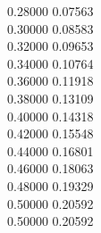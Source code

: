 \documentclass[a4paper,12pt,twoside]{report}
\numberwithin{equation}{chapter}
\begin{document}
\begin{texttt}
   0.28000\hspace{1cm}    0.07563 \\
   0.30000\hspace{1cm}    0.08583 \\
   0.32000\hspace{1cm}    0.09653 \\
   0.34000\hspace{1cm}    0.10764 \\
   0.36000\hspace{1cm}    0.11918 \\
   0.38000\hspace{1cm}    0.13109 \\
   0.40000\hspace{1cm}    0.14318 \\
   0.42000\hspace{1cm}    0.15548 \\
   0.44000\hspace{1cm}    0.16801 \\
   0.46000\hspace{1cm}    0.18063 \\
   0.48000\hspace{1cm}    0.19329 \\
   0.50000\hspace{1cm}    0.20592 \\
   0.50000\hspace{1cm}    0.20592 \\
\end{texttt}

\end{document}
